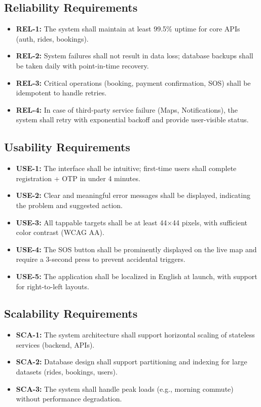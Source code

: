 \subsection{Reliability Requirements}
\begin{itemize}
\item \textbf{REL-1:} The system shall maintain at least 99.5\% uptime for core APIs (auth, rides, bookings).
\item \textbf{REL-2:} System failures shall not result in data loss; database backups shall be taken daily with point-in-time recovery.
\item \textbf{REL-3:} Critical operations (booking, payment confirmation, SOS) shall be idempotent to handle retries.
\item \textbf{REL-4:} In case of third-party service failure (Maps, Notifications), the system shall retry with exponential backoff and provide user-visible status.
\end{itemize}

\subsection{Usability Requirements}
\begin{itemize}
\item \textbf{USE-1:} The interface shall be intuitive; first-time users shall complete registration + OTP in under 4 minutes.
\item \textbf{USE-2:} Clear and meaningful error messages shall be displayed, indicating the problem and suggested action.
\item \textbf{USE-3:} All tappable targets shall be at least 44×44 pixels, with sufficient color contrast (WCAG AA).
\item \textbf{USE-4:} The SOS button shall be prominently displayed on the live map and require a 3-second press to prevent accidental triggers.
\item \textbf{USE-5:} The application shall be localized in English at launch, with support for right-to-left layouts.
\end{itemize}

\subsection{Scalability Requirements}
\begin{itemize}
\item \textbf{SCA-1:} The system architecture shall support horizontal scaling of stateless services (backend, APIs).
\item \textbf{SCA-2:} Database design shall support partitioning and indexing for large datasets (rides, bookings, users).
\item \textbf{SCA-3:} The system shall handle peak loads (e.g., morning commute) without performance degradation.
\end{itemize}

